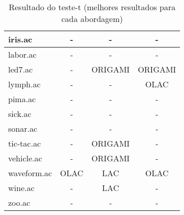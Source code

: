\begin{table}[htbp]
\begin{tabular}{|l|c|c|c|}
		iris.ac                 & -                     & -                     & -                     \\
		\hline
		labor.ac                & -                     & -                     & -                     \\
		\hline
		led7.ac                 & -                     & ORIGAMI               & ORIGAMI               \\
		\hline
		lymph.ac                & -                     & -                     & OLAC                  \\
		\hline
		pima.ac                 & -                     & -                     & -                     \\
		\hline
		sick.ac                 & -                     & -                     & -                     \\
		\hline
		sonar.ac                & -                     & -                     & -                     \\
		\hline
		tic-tac.ac              & -                     & ORIGAMI               & -                     \\
		\hline
		vehicle.ac              & -                     & ORIGAMI               & -                     \\
		\hline
		waveform.ac             & OLAC                  & LAC                   & OLAC                  \\
		\hline
		wine.ac                 & -                     & LAC                   & -                     \\
		\hline
		zoo.ac                  & -                     & -                     & -                     \\
		\hline
		\end{tabular}
	\caption{Resultado do teste-t (melhores resultados para cada abordagem)}
	\label{tab:ttest_best_avg}
\end{table}
